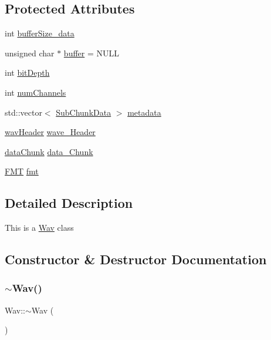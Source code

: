 \subsection*{Protected Attributes}
\begin{DoxyCompactItemize}
\item 
int \hyperlink{classWav_aaa1fc130f301f39cc74091dfb9750d13}{buffer\+Size\+\_\+data}
\item 
unsigned char $\ast$ \hyperlink{classWav_ae1ba9e10151e9d104c150f6cc5512199}{buffer} = N\+U\+LL
\item 
int \hyperlink{classWav_aaf92f0800a562d0f80783026607c8097}{bit\+Depth}
\item 
int \hyperlink{classWav_a82c5392364a4ccf8dfe725a3c7a403ec}{num\+Channels}
\item 
std\+::vector$<$ \hyperlink{structSubChunkData}{Sub\+Chunk\+Data} $>$ \hyperlink{classWav_ae6078b0bc65f5bcf4c2b7e3e7b4cf8bf}{metadata}
\item 
\hyperlink{structwavHeader}{wav\+Header} \hyperlink{classWav_a3d95345a678bba0772e48325306ecda1}{wave\+\_\+\+Header}
\item 
\hyperlink{structdataChunk}{data\+Chunk} \hyperlink{classWav_ad56011c7baf92b85b81483d7ef8b58ef}{data\+\_\+\+Chunk}
\item 
\hyperlink{structFMT}{F\+MT} \hyperlink{classWav_a2d8b662300b2821186951e428da6a6a9}{fmt}
\end{DoxyCompactItemize}


\subsection{Detailed Description}
This is a \hyperlink{classWav}{Wav} class 

\subsection{Constructor \& Destructor Documentation}
\mbox{\label{classWav_a1510b246ba121b103a60b8e7839af25f}} 
\subsubsection{\texorpdfstring{$\sim$\+Wav()}{~Wav()}}
{\footnotesize\ttfamily Wav\+::$\sim$\+Wav (\begin{DoxyParamCaption}{ }\end{DoxyParamCaption})}

